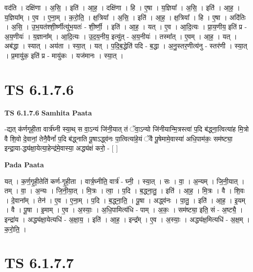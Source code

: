 \documentclass[17pt]{extarticle}
\begin{document}
वद॑ति । दक्षि॑णा । अ॒सि॒ । इति॑ । आ॒ह॒ । दक्षि॑णा । हि । ए॒षा । य॒ज्ञिया᳚ । अ॒सि॒ । इति॑ । आ॒ह॒ । य॒ज्ञिया᳚म् । ए॒व । ए॒ना॒म् । क॒रो॒ति॒ । क्ष॒त्रिया᳚ । अ॒सि॒ । इति॑ । आ॒ह॒ । क्ष॒त्रिया᳚ । हि । ए॒षा । अदि॑तिः । अ॒सि॒ । उ॒भ॒यत॑श्शी॒र्ष्णीत्यु॑भ॒यतः॑ - शी॒र्ष्णी॒ । इति॑ । आ॒ह॒ । यत् । ए॒व । आ॒दि॒त्यः । प्रा॒य॒णीय॒ इति॑ प्र - अ॒य॒णीयः॑ । य॒ज्ञाना᳚म् । आ॒दि॒त्यः । उ॒द॒य॒नीय॒ इत्यु॑त् - अ॒य॒नीयः॑ । तस्मा᳚त् । ए॒वम् । आ॒ह॒ । यत् । अब॑द्धा । स्यात् । अय॑ता । स्या॒त् । यत् । प॒दि॒ब॒द्धेति॑ पदि - ब॒द्धा । अ॒नु॒स्तर॒णीत्य॑नु - स्तर॑णी । स्या॒त् । प्र॒मायु॑क॒ इति॑ प्र - मायु॑कः । यज॑मानः । स्या॒त् ।  \newline




\section*{ TS 6.1.7.6 }

\textbf{TS 6.1.7.6 } \newline
\textbf{Samhita Paata} \newline

-द्यत् क॑र्णगृही॒ता वार्त्र॑घ्नी स्या॒थ् स वा॒ऽन्यं जि॑नी॒यात् तं ॅवा॒ऽन्यो जि॑नीयान्मि॒त्रस्त्वा॑ प॒दि ब॑द्ध्ना॒त्वित्या॑ह मि॒त्रो वै शि॒वो दे॒वानां॒ तेनै॒वैनां᳚ प॒दि ब॑द्ध्नाति पू॒षाऽद्ध्व॑नः पा॒त्वित्या॑हे॒यं ॅवै पू॒षेमामे॒वास्या॑ अधि॒पाम॑कः॒ सम॑ष्ट्या॒ इन्द्रा॒या-द्ध्य॑क्षा॒येत्या॒हेन्द्र॑मे॒वास्या॒ अद्ध्य॑क्षं करो॒ - [  ] \newline

\textbf{Pada Paata} \newline

यत् । क॒र्ण॒गृ॒ही॒तेति॑ कर्ण-गृ॒ही॒ता । वार्त्र॒घ्नीति॒ वार्त्र॑ - घ्नी॒ । स्या॒त् । सः । वा॒ । अ॒न्यम् । जि॒नी॒यात् । तम् । वा॒ । अ॒न्यः । जि॒नी॒या॒त् । मि॒त्रः । त्वा॒ । प॒दि । ब॒द्ध्ना॒तु॒ । इति॑ । आ॒ह॒ । मि॒त्रः । वै । शि॒वः । दे॒वाना᳚म् । तेन॑ । ए॒व । ए॒ना॒म् । प॒दि । ब॒द्ध्ना॒ति॒ । पू॒षा । अद्ध्व॑नः । पा॒तु॒ । इति॑ । आ॒ह॒ । इ॒यम् । वै । पू॒षा । इ॒माम् । ए॒व । अ॒स्याः॒ । अ॒धि॒पामित्य॑धि - पाम् । अ॒कः॒ । सम॑ष्ट्या॒ इति॒ सं - अ॒ष्ट्यै॒ । इन्द्रा॑य । अद्ध्य॑क्षा॒येत्यधि॑ - अ॒क्षा॒य॒ । इति॑ । आ॒ह॒ । इन्द्र᳚म् । ए॒व । अ॒स्याः॒ । अद्ध्य॑क्ष॒मित्यधि॑ - अ॒क्ष॒म् । क॒रो॒ति॒ ।  \newline




\section*{ TS 6.1.7.7 }
\end{document}
